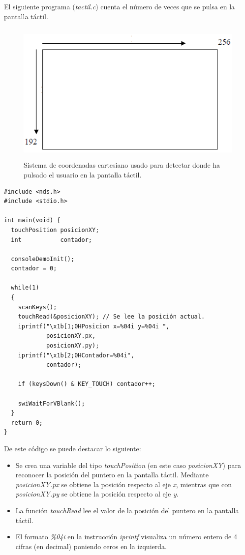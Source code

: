 \begin{example}
El siguiente programa (\textit{tactil.c}) cuenta el número de veces que se pulsa en la pantalla táctil.

\begin{figure}[t]
\centering
\includegraphics[height=7cm]{Figuras/C3/c3_coordenadas.png}
\caption{Sistema de coordenadas cartesiano usado para detectar donde ha pulsado el usuario en la pantalla táctil.}
\label{fig_c3_cartesiano}
\end{figure}

\begin{lstlisting}
#include <nds.h>
#include <stdio.h>

int main(void) {
  touchPosition posicionXY;
  int           contador;

  consoleDemoInit();
  contador = 0;

  while(1)
  {
    scanKeys();
    touchRead(&posicionXY); // Se lee la posición actual.
    iprintf("\x1b[1;0HPosicion x=%04i y=%04i ",
            posicionXY.px, 
            posicionXY.py);
    iprintf("\x1b[2;0HContador=%04i", 
            contador);

    if (keysDown() & KEY_TOUCH) contador++;

    swiWaitForVBlank();
  }
  return 0;
}
\end{lstlisting}
\end{example}

De este código se puede destacar lo siguiente:
\begin{itemize}
\item Se crea una variable del tipo \textit{touchPosition} (en este caso \textit{posicionXY}) para reconocer la posición del puntero en la pantalla táctil. Mediante \textit{posicionXY.px} se obtiene la posición respecto al eje \textit{x}, mientras que con \textit{posicionXY.py} se obtiene la posición respecto al eje \textit{y}.
%
\item La función \textit{touchRead} lee el valor de la posición del puntero en la pantalla táctil.
%
\item El formato \textit{\%04i} en la instrucción \textit{iprintf}  visualiza un número entero de 4 cifras (en decimal)  poniendo ceros en la izquierda. 
\end{itemize}

